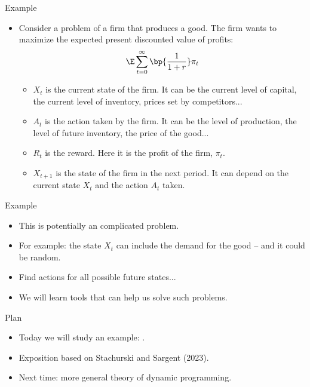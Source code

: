 \documentclass[11pt,xcolor={dvipsnames},aspectratio=159,hyperref={pdftex,pdfpagemode=UseNone,hidelinks,pdfdisplaydoctitle=true},usepdftitle=false]{beamer}
\begin{document}
\begin{frame}{Example}   
    \begin{itemize}
    \item Consider a problem of a firm that produces a good. The firm wants to maximize the expected present discounted value of profits:
    \begin{align*}
         \E \sum_{t=0}^\infty \bp{\frac{1}{1+r}} \pi_t \end{align*} \begin{itemize} \item  $X_t$ is the current state of the firm. It can be the current level of capital, the current level of inventory, prices set by competitors...
    \item  $A_t$ is the action taken by the firm. It can be the level of production, the level of future inventory, the price of the good...
    \item  $R_t$ is the reward. Here it is the profit of the firm, $\pi_t$.
    \item  $X_{t+1}$ is the state of the firm in the next period. It can depend on the current state $X_t$ and the action $A_t$ taken.
\end{itemize}
\end{itemize}
\end{frame}
 

\begin{frame}{Example}   
    \begin{itemize}
    \item  This is potentially an  complicated problem. 
    \item  For example: the state $X_t$ can include the demand for the good -- and it could be random.
    \item  Find actions for all possible future states... 
    \item  We will learn tools that can help us solve such problems.
\end{itemize}
\end{frame}

\begin{frame}{Plan}   
    \begin{itemize}
    \item  Today we will study an example: . 
    \item  Exposition based on Stachurski and Sargent (2023).
    \item  Next time: more general theory of dynamic programming.
\end{itemize}
\end{frame}
\end{document}
